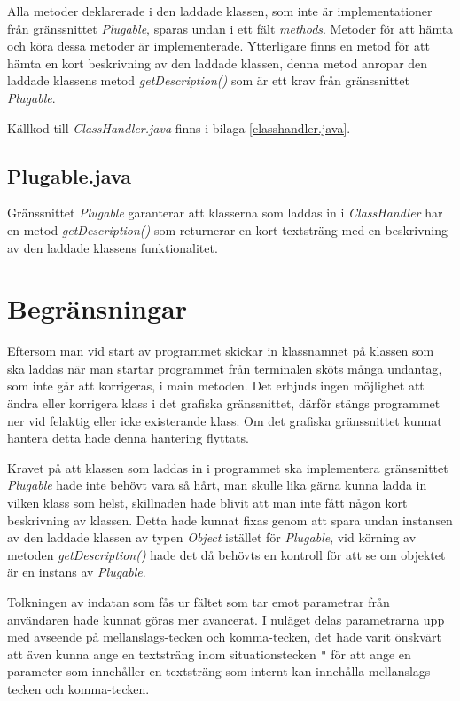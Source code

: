 \documentclass[a4paper, 12pt]{article}
\begin{document}
Alla metoder deklarerade i den laddade klassen, som inte är
implementationer från gränssnittet \textit{Plugable}, sparas undan i ett
fält \textit{methods}. Metoder för att hämta och köra dessa metoder är
implementerade. Ytterligare finns en metod för att hämta en kort
beskrivning av den laddade klassen, denna metod anropar den laddade
klassens metod \textit{getDescription()} som är ett krav från
gränssnittet \textit{Plugable}.

Källkod till \textit{ClassHandler.java} finns i bilaga
\ref{classhandler.java}.

\subsection{Plugable.java}
Gränssnittet \textit{Plugable} garanterar att klasserna som laddas in i
\textit{ClassHandler} har en metod \textit{getDescription()} som
returnerar en kort textsträng med en beskrivning av den laddade
klassens funktionalitet.

\section{Begränsningar}

Eftersom man vid start av programmet skickar in klassnamnet på klassen
som ska laddas när man startar programmet från terminalen sköts många
undantag, som inte går att korrigeras, i main metoden. Det erbjuds
ingen möjlighet att ändra eller korrigera klass i det grafiska
gränssnittet, därför stängs programmet ner vid felaktig eller icke
existerande klass. Om det grafiska gränssnittet kunnat hantera detta
hade denna hantering flyttats.

Kravet på att klassen som laddas in i programmet ska implementera
gräns\-snittet \textit{Plugable} hade inte behövt vara så hårt, man
skulle lika gärna kunna ladda in vilken klass som helst, skillnaden
hade blivit att man inte fått någon kort beskrivning av klassen. Detta
hade kunnat fixas genom att spara undan instansen av den laddade
klassen av typen \textit{Object} istället för \textit{Plugable}, vid
körning av metoden \textit{getDescription()} hade det då behövts en
kontroll för att se om objektet är en instans av \textit{Plugable}.

Tolkningen av indatan som fås ur fältet som tar emot parametrar från
anv\-ändaren hade kunnat göras mer avancerat. I nuläget delas
parametrarna upp med avseende på mellanslags-tecken och komma-tecken,
det hade varit önskvärt att även kunna ange en textsträng inom
situationstecken \verb!"! för att ange en parameter som innehåller en
textsträng som internt kan innehålla mellanslags-tecken och
komma-tecken.
\end{document}
